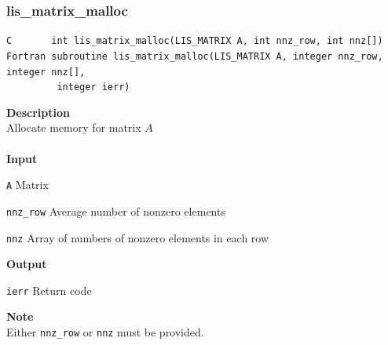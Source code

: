 \documentclass[a4paper]{article}
\newcommand{\namelistlabel}[1]{\mbox{#1}\hfill}
\newenvironment{namelist}[1]{%
 \begin{list}{}
  {\let\makelabel\namelistlabel
  \settowidth{\labelwidth}{#1}
  \setlength{\leftmargin}{1.1\labelwidth}}
}{%
\end{list}}
\begin{document}
  \subsubsection{lis\_matrix\_malloc}
\begin{screen}
\verb|C       int lis_matrix_malloc(LIS_MATRIX A, int nnz_row, int nnz[])|
\verb|Fortran subroutine lis_matrix_malloc(LIS_MATRIX A, integer nnz_row, integer nnz[],|\\
\verb|         integer ierr)|
\end{screen}
{\bf Description}\\
\indent
Allocate memory for matrix $A$
\\ \\
\noindent
{\bf Input}
\begin{namelist}{XXXXXXXXXXXXXXXXXXXX}
\item[\tt A] Matrix
\item[\tt nnz\_row] Average number of nonzero elements
\item[\tt nnz] Array of numbers of nonzero elements in each row
\end{namelist}
{\bf Output}
\begin{namelist}{XXXXXXXXXXXXXXXXXXXX}
\item[\tt ierr] Return code
\end{namelist}
{\bf Note}\\
\indent
Either \verb|nnz_row| or \verb|nnz| must be provided.
\newpage
\end{document}
